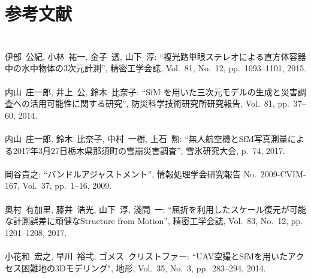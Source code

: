\chapter*{参考文献}
\lhead[参考文献]{}
\thispagestyle{empty}

\newpage

\subsection*{}
\begin{mythebibliography}{}

\leavevmode \\伊部~公紀, 小林~祐一, 金子~透, 山下~淳:
\newblock ``複光路単眼ステレオによる直方体容器中の水中物体の3次元計測'',
\newblock 精密工学会誌, Vol.~81, No.~12, pp.~1093--1101, 2015.
\\

\leavevmode \\内山~庄一郎, 井上~公, 鈴木~比奈子:
\newblock ``SfM を用いた三次元モデルの生成と災害調査への活用可能性に関する研究'',
\newblock 防災科学技術研究所研究報告, Vol.~81, pp.~37--60, 2014.
\\

\leavevmode \\内山~庄一郎, 鈴木~比奈子, 中村~一樹, 上石~勲:
\newblock ``無人航空機とSfM写真測量による2017年3月27日栃木県那須町の雪崩災害調査'',
\newblock 雪氷研究大会, p.~74, 2017.
\\

\leavevmode \\岡谷貴之:
\newblock ``バンドルアジャストメント'',
\newblock 情報処理学会研究報告 No.~2009-CVIM-167, Vol.~37, \mbox{pp.~1--16}, 2009.
\\

\leavevmode \\奥村~有加里, 藤井~浩光, 山下~淳, 淺間~一:
\newblock ``屈折を利用したスケール復元が可能な計測誤差に頑健なStructure from Motion'',
\newblock 精密工学会誌, Vol.~83, No.~12, pp. 1201--1208, 2017.
\\

\leavevmode \\小花和~宏之, 早川~裕弌, ゴメス~クリストファー:
\newblock``UAV空撮とSfMを用いたアクセス困難地の3Dモデリング",
\newblock 地形, Vol.~35, No.~3, pp.~283--294, 2014.　
\\


\end{mythebibliography}

